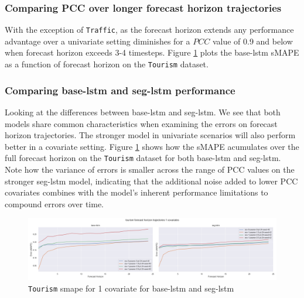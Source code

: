 \documentclass[letterpaper]{article}
\newcommand{\pearson}{PCC}
\begin{document}
\subsubsection{Comparing PCC over longer forecast horizon trajectories}
With the exception of \texttt{Traffic}, as the forecast horizon extends any performance advantage over a univariate setting diminishes for 
a $\pearson$ value of 0.9 and below when forecast horizon exceeds 3-4 timesteps. Figure \ref{fig:tourism_base_vs_seg} plots the base-lstm sMAPE as 
a function of forecast horizon on the \texttt{Tourism} dataset.
\subsubsection{Comparing base-lstm and seg-lstm performance}
Looking at the differences between base-lstm and seg-lstm. We see that both models share common characteristics when examining the errors on forecast horizon trajectories. 
The stronger model in univariate scenarios will also perform better in a covariate setting. Figure \ref{fig:tourism_base_vs_seg} shows how the sMAPE acumulates over the full forecast horizon on 
the \texttt{Tourism} dataset for both base-lstm and seg-lstm. Note how the variance of errors is smaller across the range of PCC values on 
the stronger seg-lstm model, indicating that the additional noise added to lower PCC covariates combines with the model's inherent performance limitations to compound errors over time.
\begin{figure}[ht]
  \centering
  \includegraphics[width=1.\textwidth]{figures/base-lstm_seg-lstm_tourism_k_1_trajectory.png}
  \caption{\texttt{Tourism} smape for 1 covariate for base-lstm and seg-lstm}
  \label{fig:tourism_base_vs_seg}
  \end{figure}
\end{document}
